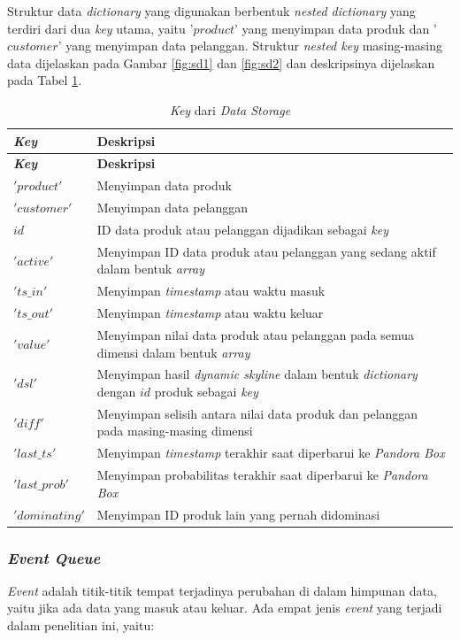 Struktur data \textit{dictionary} yang digunakan berbentuk \textit{nested dictionary} yang terdiri dari dua \textit{key} utama, yaitu '$product$' yang menyimpan data produk dan '$customer$' yang menyimpan data pelanggan. Struktur \textit{nested key} masing-masing data dijelaskan pada Gambar \ref{fig:sd1} dan \ref{fig:sd2} dan deskripsinya dijelaskan pada Tabel \ref{tab:desc-key}.

\begin{longtable}{| p{2.5cm} | p{6.5cm} |}
	\caption{\textit{Key} dari \textit{Data Storage} \label{tab:desc-key}}
	\hline
	\textbf{\textit{Key}} & \textbf{Deskripsi} \\ \hline 
	\endfirsthead
	\hline
	\textbf{\textit{Key}} & \textbf{Deskripsi} \\ \hline 
	\endhead
	$'product'$ & Menyimpan data produk \\ \hline
	$'customer'$ & Menyimpan data pelanggan \\ \hline
	$id$ & ID data produk atau pelanggan dijadikan sebagai \textit{key} \\ \hline
	$'active'$ & Menyimpan ID data produk atau pelanggan yang sedang aktif dalam bentuk \textit{array} \\ \hline
	$'ts\_in'$ & Menyimpan \textit{timestamp} atau waktu masuk \\ \hline
	$'ts\_out'$ & Menyimpan \textit{timestamp} atau waktu keluar \\ \hline
	$'value'$ & Menyimpan nilai data produk atau pelanggan pada semua dimensi dalam bentuk \textit{array}\\ \hline
	$'dsl'$ & Menyimpan hasil \textit{dynamic skyline} dalam bentuk \textit{dictionary} dengan $id$ produk sebagai \textit{key}\\ \hline
	$'diff'$ & Menyimpan selisih antara nilai data produk dan pelanggan pada masing-masing dimensi \\ \hline
	$'last\_ts'$ & Menyimpan \textit{timestamp} terakhir saat diperbarui ke \textit{Pandora Box}\\ \hline
	$'last\_prob'$ & Menyimpan probabilitas terakhir saat diperbarui ke \textit{Pandora Box}\\ \hline
	$'dominating'$ & Menyimpan ID produk lain yang pernah didominasi\\ \hline
\end{longtable}

\subsubsection{\textit{Event Queue}}
\tab \textit{Event} adalah titik-titik tempat terjadinya perubahan di dalam himpunan data, yaitu jika ada data yang masuk atau keluar. Ada empat jenis \textit{event} yang terjadi dalam penelitian ini, yaitu:

